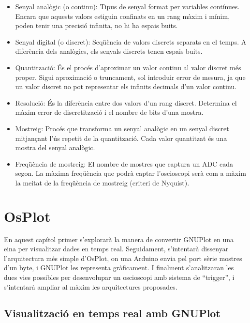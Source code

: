 \documentclass{tfgitic}[2023/06/30]
\begin{document}
\begin{itemize}
	\item Senyal analògic (o continu): Tipus de senyal format per
          variables contínues. Encara que aquests valors estiguin
          confinats en un rang màxim i mínim, poden tenir una precisió
          infinita, no hi ha espais buits.
	\item Senyal digital (o discret): Seqüència de valors discrets
          separats en el temps. A diferència dels analògics, els
          senyals discrets tenen espais buits.
	\item Quantització: És el procés d'aproximar un valor continu
          al valor discret més proper. Sigui aproximació o truncament,
          sol introduir error de mesura, ja que un valor discret no
          pot representar els infinits decimals d'un valor continu.
	\item Resolució: És la diferència entre dos valors d'un rang
          discret. Determina el màxim error de discretització i el
          nombre de bits d'una mostra.
	\item Mostreig: Procés que transforma un senyal analògic en un
          senyal discret mitjançant l'ús repetit de la quantització.
          Cada valor quantitzat és una mostra del senyal analògic.
	\item Freqüència de mostreig: El nombre de mostres que captura
          un ADC cada segon. La màxima freqüència que podrà captar
          l'osci\lgem oscopi serà com a màxim la meitat de la
          freqüència de mostreig (criteri de Nyquist).
\end{itemize}

\chapter{OsPlot}

En aquest capítol primer s'explorarà la manera de convertir GNUPlot en
una eina per visualitzar dades en temps real. Seguidament, s'intentarà
dissenyar l'arquitectura més simple d'OsPlot, on una Arduino envia pel
port sèrie mostres d'un byte, i GNUPlot les representa gràficament. I
finalment s'analitzaran les dues vies possibles per desenvolupar un
osci\lgem oscopi amb sistema de ``trigger'', i s'intentarà ampliar al
màxim les arquitectures proposades.

\section{Visualització en temps real amb GNUPlot}
\end{document}
